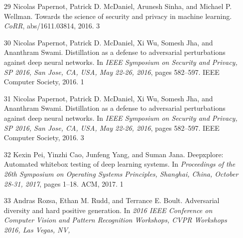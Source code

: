 \documentclass{article}
\begin{document}
\begin{itemize}
\item 
[29] Nicolas Papernot, Patrick D. McDaniel, Arunesh Sinha, and Michael P. Wellman. Towards the science of security and privacy in machine learning. \textit{CoRR}, abs/1611.03814, 2016. 3

\item 
[30] Nicolas Papernot, Patrick D. McDaniel, Xi Wu, Somesh Jha, and Ananthram Swami. Distillation as a defense to adversarial perturbations against deep neural networks. In \textit{IEEE Symposium on Security and Privacy, SP 2016, San Jose, CA, USA, May 22-26, 2016}, pages 582–597. IEEE Computer Society, 2016. 1

\item 
[31] Nicolas Papernot, Patrick D. McDaniel, Xi Wu, Somesh Jha, and Ananthram Swami. Distillation as a defense to adversarial perturbations against deep neural networks. In \textit{IEEE Symposium on Security and Privacy, SP 2016, San Jose, CA, USA, May 22-26, 2016}, pages 582–597. IEEE Computer Society, 2016. 3

\item 
[32] Kexin Pei, Yinzhi Cao, Junfeng Yang, and Suman Jana. Deepxplore: Automated whitebox testing of deep learning systems. In \textit{Proceedings of the 26th Symposium on Operating Systems Principles, Shanghai, China, October 28-31, 2017}, pages 1–18. ACM, 2017. 1

\item 
[33] Andras Rozsa, Ethan M. Rudd, and Terrance E. Boult. Adversarial diversity and hard positive generation. In \textit{2016 IEEE Conference on Computer Vision and Pattern Recognition Workshops, CVPR Workshops 2016, Las Vegas, NV,}

\end{itemize}
\end{document}
